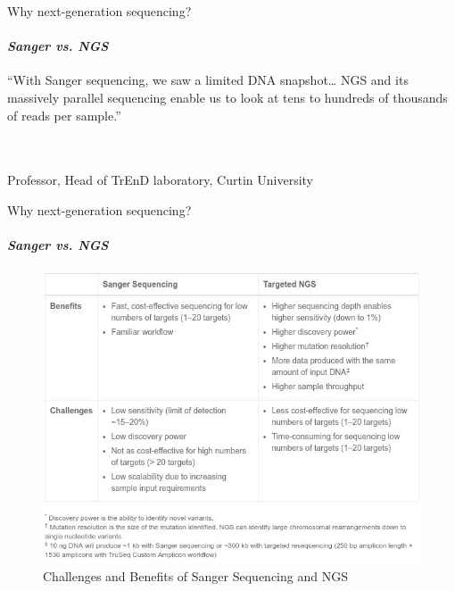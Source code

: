 \documentclass{if-beamer}
\begin{document}
\begin{frame}{Why next-generation sequencing?}
\framesubtitle{\emph{Sanger vs. NGS}}
\begin{huge}
“With Sanger sequencing, we saw a limited DNA snapshot… NGS and its massively parallel sequencing enable us to look at tens to hundreds of thousands of reads per sample.”
\end{huge}
\\~\\
Professor, Head of TrEnD laboratory, Curtin University
\end{frame}
\begin{frame}{Why next-generation sequencing?}
\framesubtitle{\emph{Sanger vs. NGS}}
\begin{figure}
\centering
\includegraphics[scale=0.35]{sanger_sequencing.jpg}
\caption{Challenges and Benefits of Sanger Sequencing and NGS}
\end{figure}
\end{frame}
\end{document}
